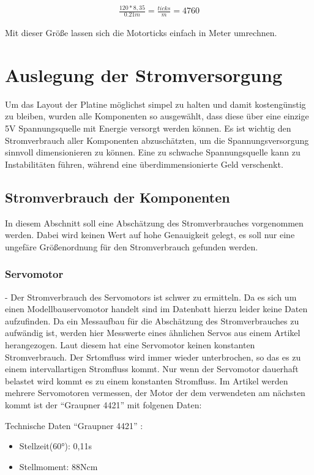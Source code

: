 \begin{align}
\frac{120*8,35}{0.21m}=\frac{ticks}{m}=4760
\end{align}

Mit dieser Größe lassen sich die Motorticks einfach in Meter umrechnen. 

\section{Auslegung der Stromversorgung}

Um das Layout der Platine möglichst simpel zu halten und damit kostengünstig zu bleiben, wurden alle Komponenten so ausgewählt, dass diese über eine einzige 5V Spannungsquelle mit Energie versorgt werden können.
Es ist wichtig den Stromverbrauch aller Komponenten abzuschätzten, um die Spannungsversorgung sinnvoll dimensionieren zu können. Eine zu schwache Spannungsquelle kann zu Instabilitäten führen,
während eine überdimmensionierte Geld verschenkt.

\subsection{Stromverbrauch der Komponenten}
In diesem Abschnitt soll eine Abschätzung des Stromverbrauches vorgenommen werden. Dabei wird keinen Wert auf hohe Genauigkeit gelegt, es soll nur eine ungefäre Größenordnung für den Stromverbrauch gefunden werden.

\subsubsection{Servomotor}-
Der Stromverbrauch des Servomotors ist schwer zu ermitteln. Da es sich um einen Modellbauservomotor handelt 
sind im Datenbatt hierzu leider keine Daten aufzufinden. Da ein Messaufbau für die Abschätzung des Stromverbrauches
zu aufwändig ist, werden hier Messwerte eines ähnlichen Servos aus einem Artikel \cite{website-servo} herangezogen.
Laut diesem hat eine Servomotor keinen konstanten Stromverbrauch. Der Srtomfluss wird immer wieder unterbrochen, so das es zu einem intervallartigen Stromfluss kommt.
Nur wenn der Servomotor dauerhaft belastet wird kommt es zu einem konstanten Stromfluss.
Im Artikel werden mehrere Servomotoren vermessen, der Motor der dem verwendeten am nächsten kommt ist der ``Graupner 4421'' mit folgenen Daten:


Technische Daten ``Graupner 4421'' \cite{website-servo-vergleich-dat}:
\begin{itemize}
 \item Stellzeit(60°): 0,11s
 \item Stellmoment: 88Ncm 
\end{itemize}



